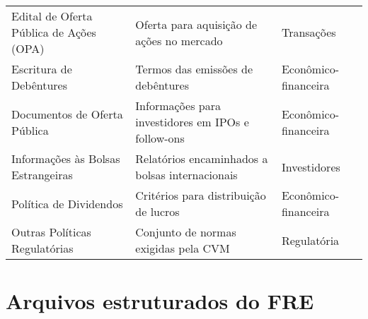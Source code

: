 \documentclass[recuosum=1.5cm]{iftex2024}
\begin{document}
\begin{longtable}{p{6.5cm} p{5.5cm} p{2.5cm}}
	Edital de Oferta Pública de Ações (OPA) & Oferta para aquisição de ações no mercado & Transações  \\
	Escritura de Debêntures & Termos das emissões de debêntures & Econômico-financeira \\
	Documentos de Oferta Pública & Informações para investidores em IPOs e follow-ons & Econômico-financeira \\
	Informações às Bolsas Estrangeiras & Relatórios encaminhados a bolsas internacionais & Investidores \\
	Política de Dividendos & Critérios para distribuição de lucros & Econômico-financeira \\
	Outras Políticas Regulatórias & Conjunto de normas exigidas pela CVM & Regulatória \\
	
	\bottomrule
\end{longtable}
\begin{flushleft}
\end{flushleft}


\chapter{Arquivos estruturados do FRE}\label{ap:fre-visao-geral}
\end{document}
